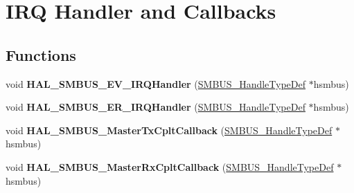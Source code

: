 \hypertarget{group___s_m_b_u_s___i_r_q___handler__and___callbacks}{}\section{I\+RQ Handler and Callbacks}
\label{group___s_m_b_u_s___i_r_q___handler__and___callbacks}
\subsection*{Functions}
\begin{DoxyCompactItemize}
\item 
\mbox{\label{group___s_m_b_u_s___i_r_q___handler__and___callbacks_ga359d538b1f467d7b562ca9ccf3d07c31}} 
void {\bfseries H\+A\+L\+\_\+\+S\+M\+B\+U\+S\+\_\+\+E\+V\+\_\+\+I\+R\+Q\+Handler} (\hyperlink{struct_s_m_b_u_s___handle_type_def}{S\+M\+B\+U\+S\+\_\+\+Handle\+Type\+Def} $\ast$hsmbus)
\item 
\mbox{\label{group___s_m_b_u_s___i_r_q___handler__and___callbacks_gabcdffc8b0a2f9df905f7c7c38cfb5cab}} 
void {\bfseries H\+A\+L\+\_\+\+S\+M\+B\+U\+S\+\_\+\+E\+R\+\_\+\+I\+R\+Q\+Handler} (\hyperlink{struct_s_m_b_u_s___handle_type_def}{S\+M\+B\+U\+S\+\_\+\+Handle\+Type\+Def} $\ast$hsmbus)
\item 
\mbox{\label{group___s_m_b_u_s___i_r_q___handler__and___callbacks_ga5b0c11c8ceb53ac2f7c0f78309fe4362}} 
void {\bfseries H\+A\+L\+\_\+\+S\+M\+B\+U\+S\+\_\+\+Master\+Tx\+Cplt\+Callback} (\hyperlink{struct_s_m_b_u_s___handle_type_def}{S\+M\+B\+U\+S\+\_\+\+Handle\+Type\+Def} $\ast$hsmbus)
\item 
\mbox{\label{group___s_m_b_u_s___i_r_q___handler__and___callbacks_ga4d01fedd1d3ebf6605a2aca56e0f38af}} 
void {\bfseries H\+A\+L\+\_\+\+S\+M\+B\+U\+S\+\_\+\+Master\+Rx\+Cplt\+Callback} (\hyperlink{struct_s_m_b_u_s___handle_type_def}{S\+M\+B\+U\+S\+\_\+\+Handle\+Type\+Def} $\ast$hsmbus)
\item 
\mbox{\label{group___s_m_b_u_s___i_r_q___handler__and___callbacks_gaa19d5a6fceb7ef7bc213ce7e677ef056}} 

\end{DoxyCompactItemize}
